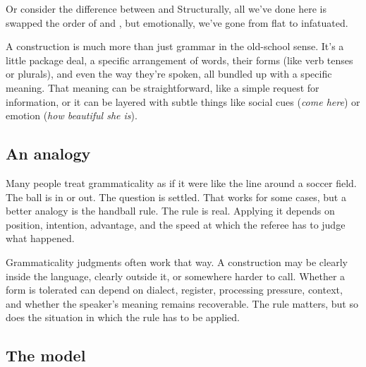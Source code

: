 \bigskip

Or consider the difference between  and  Structurally, all we've done here is swapped the order of  and , but emotionally, we've gone from flat to infatuated.

\bigskip

A construction is much more than just grammar in the old-school sense. It's a little package deal, a specific arrangement of words, their forms (like verb tenses or plurals), and even the way they're spoken, all bundled up with a specific meaning. That meaning can be straightforward, like a simple request for information, or it can be layered with subtle things like social cues (\textit{come here}) or emotion (\textit{how beautiful she is}).

\subsection{An analogy}

Many people treat grammaticality as if it were like the line around a
soccer field. The ball is in or out. The question is settled. That works
for some cases, but a better analogy is the handball rule. The rule is
real. Applying it depends on position, intention, advantage, and the speed
at which the referee has to judge what happened.

Grammaticality judgments often work that way. A construction may be
clearly inside the language, clearly outside it, or somewhere harder to
call. Whether a form is tolerated can depend on dialect, register,
processing pressure, context, and whether the speaker's meaning remains
recoverable. The rule matters, but so does the situation in which the
rule has to be applied.

\subsection{The model}

